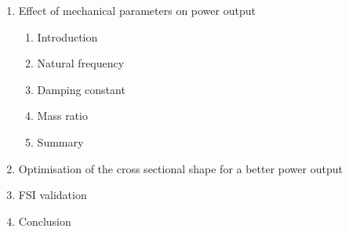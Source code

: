 \documentclass{article}
\begin{document}
\begin{enumerate}
\begin{enumerate}[i]
\end{enumerate}
\item Effect of mechanical parameters on power output
\begin{enumerate}[i]
\item Introduction
\item Natural frequency 
\item Damping constant 
\item Mass ratio
\item Summary
\end{enumerate}
\item{Optimisation of the cross sectional shape for a better power output}
\item{FSI validation}
\item Conclusion
\end{enumerate}
\end{document}
